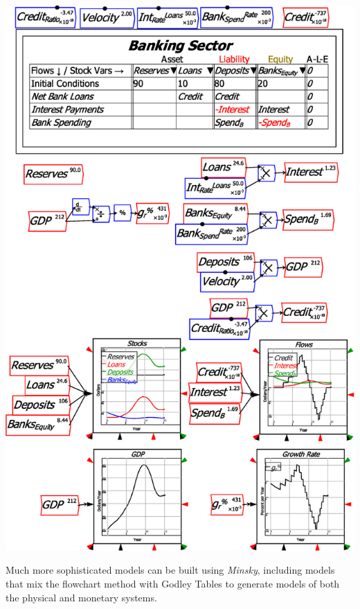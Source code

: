 \noindent\includegraphics[width=\textwidth]{images/MonetaryModel01GodleyTable07GDP}

Much more sophisticated models can be built using \emph{Minsky}, including
models that mix the flowchart method with Godley Tables to generate
models of both the physical and monetary systems.
